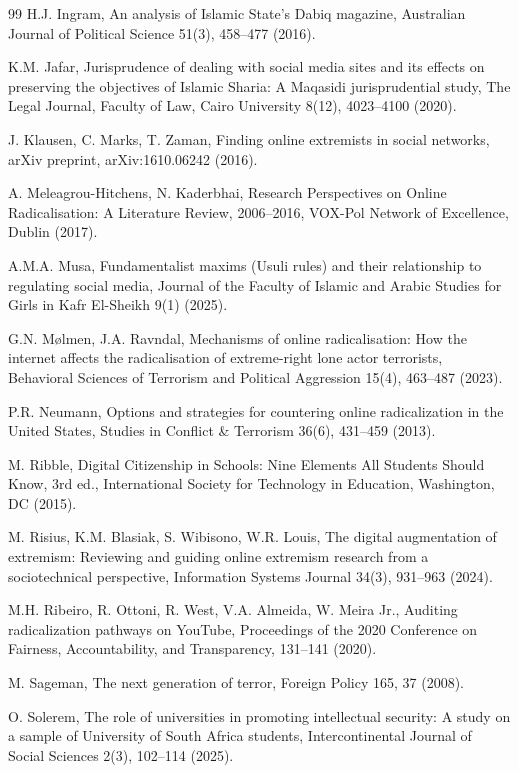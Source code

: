 \documentclass{NSP1}
\begin{document}
\begin{thebibliography}{99}
H.J. Ingram, An analysis of Islamic State's Dabiq magazine, Australian Journal of Political Science 51(3), 458–477 (2016).

K.M. Jafar, Jurisprudence of dealing with social media sites and its effects on preserving the objectives of Islamic Sharia: A Maqasidi jurisprudential study, The Legal Journal, Faculty of Law, Cairo University 8(12), 4023–4100 (2020).

J. Klausen, C. Marks, T. Zaman, Finding online extremists in social networks, arXiv preprint, arXiv:1610.06242 (2016).

A. Meleagrou-Hitchens, N. Kaderbhai, Research Perspectives on Online Radicalisation: A Literature Review, 2006–2016, VOX-Pol Network of Excellence, Dublin (2017).

A.M.A. Musa, Fundamentalist maxims (Usuli rules) and their relationship to regulating social media, Journal of the Faculty of Islamic and Arabic Studies for Girls in Kafr El-Sheikh 9(1) (2025).

G.N. Mølmen, J.A. Ravndal, Mechanisms of online radicalisation: How the internet affects the radicalisation of extreme-right lone actor terrorists, Behavioral Sciences of Terrorism and Political Aggression 15(4), 463–487 (2023).

P.R. Neumann, Options and strategies for countering online radicalization in the United States, Studies in Conflict \& Terrorism 36(6), 431–459 (2013).

M. Ribble, Digital Citizenship in Schools: Nine Elements All Students Should Know, 3rd ed., International Society for Technology in Education, Washington, DC (2015).

M. Risius, K.M. Blasiak, S. Wibisono, W.R. Louis, The digital augmentation of extremism: Reviewing and guiding online extremism research from a sociotechnical perspective, Information Systems Journal 34(3), 931–963 (2024).

M.H. Ribeiro, R. Ottoni, R. West, V.A. Almeida, W. Meira Jr., Auditing radicalization pathways on YouTube, Proceedings of the 2020 Conference on Fairness, Accountability, and Transparency, 131–141 (2020).

M. Sageman, The next generation of terror, Foreign Policy 165, 37 (2008).

O. Solerem, The role of universities in promoting intellectual security: A study on a sample of University of South Africa students, Intercontinental Journal of Social Sciences 2(3), 102–114 (2025).


\end{thebibliography}
\end{document}
